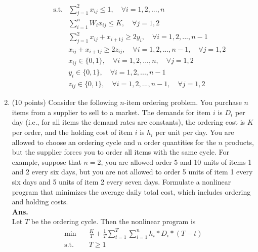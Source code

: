 \documentclass[14pt]{article}
\begin{document}
\begin{enumerate}
\begin{enumerate}
\begin{align*}
                              \text{s.t.} & \sum_{j=1}^2 x_{ij} \leq 1, \quad \forall i = 1, 2, ..., n                                          \\
                                          & \sum_{i=1}^n W_ix_{ij} \leq K, \quad \forall j = 1, 2                                               \\
                                          & \sum_{j=1}^2 x_{ij} + x_{i+1j} \geq 2y_i, \quad \forall i = 1, 2, ..., n-1                          \\
                                          & x_{ij}+x_{i+1j} \geq 2z_{ij}, \quad \forall i = 1, 2, ..., n-1, \quad \forall j = 1, 2              \\
                                          & x_{ij} \in \{0, 1\}, \quad \forall i = 1, 2, ..., n, \quad \forall j = 1, 2                         \\
                                          & y_i \in \{0, 1\}, \quad \forall i = 1, 2, ..., n-1                                                  \\
                                          & z_{ij} \in \{0, 1\}, \quad \forall i = 1, 2, ..., n-1, \quad \forall j = 1, 2
                        \end{align*}
            \end{enumerate}
      \item (10 points) Consider the following $n$-item ordering problem. You purchase $n$ items from a supplier to sell to a market. The demands for item $i$ is $D_i$ per day (i.e., for all items the demand rates are constants), the ordering cost is $K$ per order, and the holding cost of item $i$ is $h_i$ per unit per day. You are allowed to choose an ordering cycle and $n$ order quantities for the $n$ products, but the supplier forces you to order all items with the same cycle. For example, suppose that $n = 2$, you are allowed order 5 and 10 units of items 1 and 2 every six days, but you are not allowed to order 5 units of item 1 every six days and 5 units of item 2 every seven days. Formulate a nonlinear program that minimizes the average daily total cost, which includes ordering and holding costs.\\
            \textbf{Ans.}\\
            Let $T$ be the ordering cycle. Then the nonlinear program is
            \begin{align*}
                  \min \quad   & \frac{K}{T} + \frac{1}{T}\sum_{t=1}^T\sum_{i=1}^n h_i*D_i*(T-t) \\
                  \text{s.t. } & T \geq 1                                                        \\
            \end{align*}
\end{enumerate}
\end{document}
